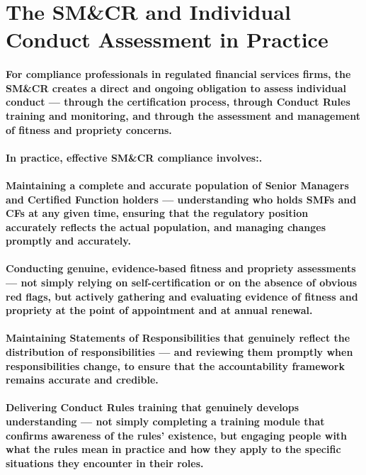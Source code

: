 \section{The SM\&CR and Individual Conduct Assessment in Practice}
\paragraph{For compliance professionals in regulated financial services firms, the SM\&CR creates a direct and ongoing obligation to assess individual conduct — through the certification process, through Conduct Rules training and monitoring, and through the assessment and management of fitness and propriety concerns.}
\paragraph{In practice, effective SM\&CR compliance involves:.}
\paragraph{\textbf{Maintaining a complete and accurate population of Senior Managers and Certified Function holders} — understanding who holds SMFs and CFs at any given time, ensuring that the regulatory position accurately reflects the actual population, and managing changes promptly and accurately.}
\paragraph{\textbf{Conducting genuine, evidence-based fitness and propriety assessments} — not simply relying on self-certification or on the absence of obvious red flags, but actively gathering and evaluating evidence of fitness and propriety at the point of appointment and at annual renewal.}
\paragraph{\textbf{Maintaining Statements of Responsibilities that genuinely reflect the distribution of responsibilities} — and reviewing them promptly when responsibilities change, to ensure that the accountability framework remains accurate and credible.}
\paragraph{\textbf{Delivering Conduct Rules training that genuinely develops understanding} — not simply completing a training module that confirms awareness of the rules' existence, but engaging people with what the rules mean in practice and how they apply to the specific situations they encounter in their roles.}
